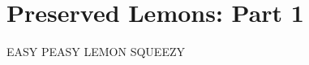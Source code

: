 \chapter*{Preserved Lemons: Part 1}
\renewcommand{\chaptertitle}{Preserved Lemons: Part 1}

EASY PEASY LEMON SQUEEZY
